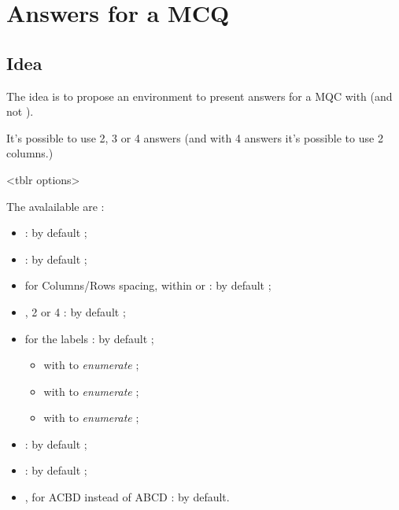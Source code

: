 \documentclass[english,11pt,a4paper]{article}
\begin{document}
\newpage

\section{Answers for a MCQ}

\subsection{Idea}

The idea is to propose an environment to present answers for a MQC with  (and not ).

\smallskip

It's possible to use 2, 3 or 4 answers (and with 4 answers it's possible to use 2 columns.)

\begin{codehigh}[language=latex/latex3,style/main=teal!25,style/code=teal!25]
<tblr options>
\end{codehigh}

The avalailable  are :

\begin{itemize}
	\item {} :  by default ;
	\item {}  :  by default ;
	\item {} for Columns/Rows spacing, within  or  : \MontreCode{6pt/2pt} by default ;
	\item {}, 2 or 4 :  by default ;
	\item {} for the labels :  by default ;
	\begin{itemize}
		\item with  to \textit{enumerate}  ;
		\item with  to \textit{enumerate}  ;
		\item with  to \textit{enumerate}  ;
	\end{itemize}
	\item {} :  by default ;
	\item {} :  by default ;
	\item {}, for ACBD instead of ABCD :  by default.
\end{itemize}
\end{document}
